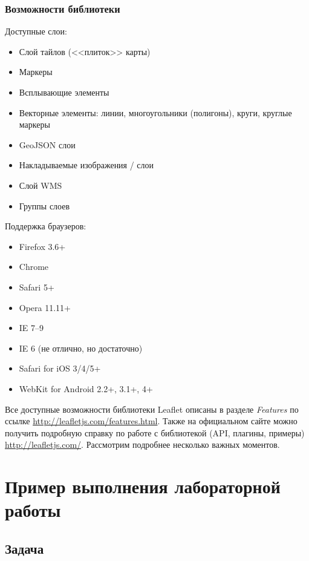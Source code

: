 \subsection{Возможности библиотеки}
Доступные слои:
\begin{itemize}
    \item Слой тайлов (<<плиток>> карты)
    \item Маркеры
    \item Всплывающие элементы
    \item Векторные элементы: линии, многоугольники (полигоны), круги,
        круглые маркеры
    \item GeoJSON слои
    \item Накладываемые изображения / слои
    \item Слой WMS
    \item Группы слоев
\end{itemize}

Поддержка браузеров:
\begin{itemize}
    \item Firefox 3.6+
    \item Chrome
    \item Safari 5+
    \item Opera 11.11+
    \item IE 7–9
    \item IE 6 (не отлично, но достаточно)
    \item Safari for iOS 3/4/5+
    \item WebKit for Android 2.2+, 3.1+, 4+
\end{itemize}

Все доступные возможности библиотеки Leaflet описаны в разделе 
\emph{Features} по ссылке \url{http://leafletjs.com/features.html}. 
Также на официальном сайте можно получить подробную справку по 
работе с библиотекой (API, плагины, примеры) \url{http://leafletjs.com/}. 
Рассмотрим подробнее несколько важных моментов.

\chapter{Пример выполнения лабораторной работы}
\section{Задача}
